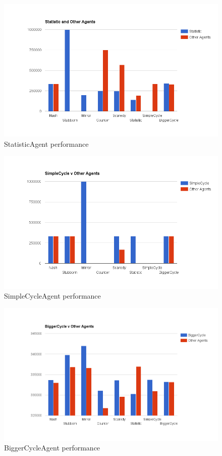 \documentclass[12pt]{article}
\begin{document}
\begin{figure}[H]
\includegraphics[scale=0.5]{images/statistic.png}
\caption{StatisticAgent performance}
\label{fig:statistic}
\end{figure}

\begin{figure}[H]
\includegraphics[scale=0.5]{images/simple_cycle.png}
\caption{SimpleCycleAgent performance}
\label{fig:simple_cycle}
\end{figure}

\begin{figure}[H]
\includegraphics[scale=0.5]{images/bigger_cycle.png}
\caption{BiggerCycleAgent performance}
\label{fig:bigger_cycle}
\end{figure}
\end{document}
